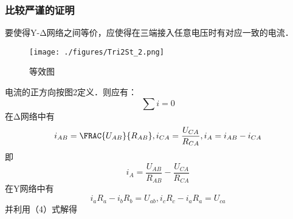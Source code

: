 \subsubsection{比较严谨的证明}
要使得Y-Δ网络之间等价，应使得在三端接入任意电压时有对应一致的电流．
\begin{figure}[ht]
\centering
\texttt{[image: ./figures/Tri2St\_2.png]}
\caption{等效图} \label{Tri2St_fig2}
\end{figure}
电流的正方向按图2定义．则应有：
\begin{equation}
\sum{i}=0
\end{equation}
在Δ网络中有
\begin{equation}
i_{AB}=\FRAC{U_{AB}}{R_{AB}},i_{CA}=\frac{U_{CA}}{R_{CA}},i_A=i_{AB}-i_{CA}
\end{equation}
即
\begin{equation}
i_A=\frac{U_{AB}}{R_{AB}}-\frac{U_{CA}}{R_{CA}}
\end{equation}
在Y网络中有
\begin{equation}
i_a R_a-i_b R_b=U_{ab},i_c R_c-i_a R_a=U_{ca}
\end{equation}
并利用（4）式解得
